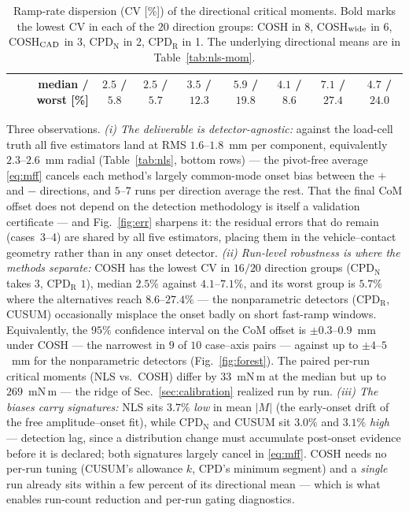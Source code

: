 \documentclass[10pt]{article}
\begin{document}
\begin{table}[t]
\begin{tabular}{cc rr rr rr rr rr rr rr}
\midrule
\multicolumn{2}{r}{median / worst [\%]} & \multicolumn{2}{c}{$2.5$ / $5.8$} & \multicolumn{2}{c}{$2.5$ / $5.7$} & \multicolumn{2}{c}{$3.5$ / $12.3$} & \multicolumn{2}{c}{$5.9$ / $19.8$} & \multicolumn{2}{c}{$4.1$ / $8.6$} & \multicolumn{2}{c}{$7.1$ / $27.4$} & \multicolumn{2}{c}{$4.7$ / $24.0$} \\
\bottomrule
\end{tabular}
\caption{Ramp-rate dispersion (CV [\%]) of the directional critical
moments. Bold marks the lowest CV in each of the $20$ direction groups:
COSH in 8, COSH$_{\rm wide}$ in 6, COSH$_{\rm CAD}$ in 3, CPD$_{\mathrm{N}}$ in 2, CPD$_{\mathrm{R}}$ in 1. The underlying directional means are in
Table~\ref{tab:nls-mom}.}
\label{tab:nls-disp}
\end{table}

Three observations. \emph{(i) The deliverable is detector-agnostic:}
against the load-cell truth all five estimators land at RMS
$1.6$--$1.8$~mm per component, equivalently $2.3$--$2.6$~mm radial
(Table~\ref{tab:nls}, bottom rows) — the pivot-free
average \eqref{eq:mff} cancels each method's largely common-mode onset
bias between the $+$ and $-$ directions, and $5$--$7$ runs per
direction average the rest. That the final CoM offset does not depend
on the detection methodology is itself a validation certificate — and
Fig.~\ref{fig:err} sharpens it: the residual errors that do remain
(cases~3--4) are shared by all five estimators, placing them in the
vehicle--contact geometry rather than in any onset detector.
\emph{(ii) Run-level robustness is where the methods separate:} COSH
has the lowest CV in $16/20$ direction groups (CPD$_{\mathrm{N}}$
takes $3$, CPD$_{\mathrm{R}}$ $1$), median $2.5\%$ against
$4.1$--$7.1\%$, and its worst group is $5.7\%$ where the alternatives
reach $8.6$--$27.4\%$ — the nonparametric detectors (CPD$_{\mathrm{R}}$,
CUSUM) occasionally misplace the onset badly on short fast-ramp
windows. Equivalently, the $95\%$ confidence interval on the CoM
offset is $\pm0.3$--$0.9$~mm under COSH — the narrowest in $9$ of
$10$ case--axis pairs — against up to $\pm4$--$5$~mm for the
nonparametric detectors (Fig.~\ref{fig:forest}). The paired per-run critical moments (NLS vs.\ COSH) differ by
$33$~mN\,m at the median but up to $269$~mN\,m — the ridge of
Sec.~\ref{sec:calibration} realized run by run. \emph{(iii) The biases
carry signatures:} NLS sits $3.7\%$ \emph{low} in mean $|M|$ (the
early-onset drift of the free amplitude--onset fit), while
CPD$_{\mathrm{N}}$ and CUSUM sit $3.0\%$ and $3.1\%$ \emph{high} —
detection lag, since a distribution change must accumulate post-onset
evidence before it is declared; both signatures largely cancel in
\eqref{eq:mff}. COSH needs no per-run tuning (CUSUM's allowance $k$,
CPD's minimum segment) and a \emph{single} run already sits within a
few percent of its directional mean — which is what enables run-count
reduction and per-run gating diagnostics.
\end{document}
